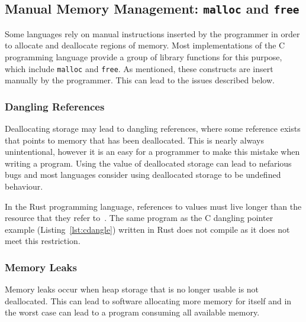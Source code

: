 \subsection{Manual Memory Management: \lstinline{malloc} and \lstinline{free}}
Some languages rely on manual instructions inserted by the programmer in order
to allocate and deallocate regions of memory. Most implementations of the C
programming language provide a group of library functions for this purpose,
which include \lstinline{malloc} and \lstinline{free}. As mentioned, these
constructs are insert manually by the programmer. This can lead to the issues
described below.

\subsubsection{Dangling References}\label{sec:dangle}
Deallocating storage may lead to dangling references, where some reference 
exists that points to memory that has been deallocated. This is nearly always
unintentional, however it is an easy for a programmer to make this mistake when
writing a program. Using the value of deallocated storage can lead to nefarious
bugs and most languages consider using deallocated storage to
be undefined behaviour.



In the Rust programming language, references to values must live longer than
the resource that they refer to~\cite{rust-borrowing}. The same program as the 
C dangling pointer example (Listing~\ref{lst:cdangle}) written in Rust does not
compile as it does not meet this restriction.



\subsubsection{Memory Leaks}\label{sec:leak}
Memory leaks occur when heap storage that is no longer usable is not
deallocated. This can lead to software allocating more memory for itself and in
the worst case can lead to a program consuming all available memory.



